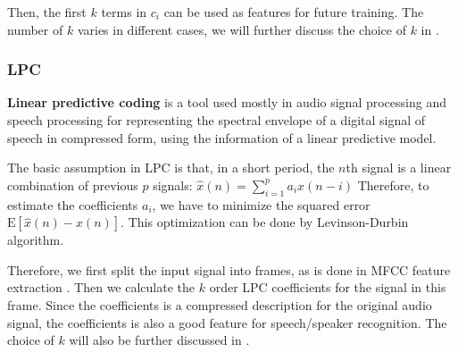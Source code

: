 Then, the first $k$ terms in $c_i $ can be used as features for future training.
The number of $k$ varies in different cases, we will further discuss the choice of $k$ in .

\subsubsection{LPC}
\textbf{Linear predictive coding} is a tool used mostly in audio signal processing and speech
processing for representing the spectral envelope of a
digital signal of speech in compressed form, using the information of a linear predictive model.\cite{lpc}

The basic assumption in LPC is that,
    in a short period, the $n$th signal is a linear combination of previous $p$ signals:
    $ \hat{x}(n) = \sum_{i=1}^pa_i x(n-i)$
    Therefore, to estimate the coefficients $ a_i$, we have to minimize the squared error
    $ \text{E}\left[ \hat{x}(n) - x(n)\right]$.
    This optimization can be done by Levinson-Durbin algorithm.\cite{levinson-durbin}

    Therefore, we first split the input signal into frames, as is done in MFCC feature extraction .
    Then we calculate the $k$ order LPC coefficients for the signal in this frame.
    Since the coefficients is a compressed description for the original audio signal,
    the coefficients is also a good feature for speech/speaker recognition.
    The choice of $k$ will also be further discussed in .

